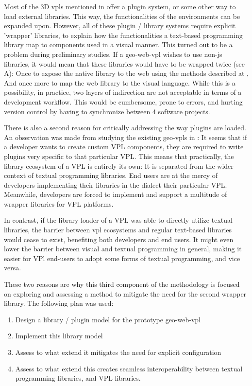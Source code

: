 
Most of the 3D vpls mentioned in  offer a plugin system, or some other way to load external libraries.
This way, the functionalities of the environments can be expanded upon.
However, all of these plugin / library systems require explicit 'wrapper' libraries, to explain how the functionalities a text-based programming library map to components used in a visual manner.
This turned out to be a problem during preliminary studies.
If a \ac{geo-web-vpl} wishes to use non-js libraries, it would mean that these libraries would have to be wrapped twice (see  A): 
Once to expose the native library to the web using the methods described at ,
And once more to map the web library to the visual language. 
While this is a possibility, in practice, two layers of indirection are not acceptable in terms of a development workflow.
This would be cumbersome, prone to errors, and hurting version control by having to synchronize between 4 software projects. 

There is also a second reason for critically addressing the way plugins are loaded. 
An observation was made from studying the existing geo-vpls in :
It seems that if a developer wants to create custom VPL components, they are required to write plugins very specific to that particular VPL.
This means that practically, the library ecosystem of a VPL is entirely its own: 
It is separated from the wider context of textual programming libraries. 
End users are at the mercy of developers implementing their libraries in the dialect their particular VPL.
Meanwhile, developers are forced to implement and support a multitude of wrapper libraries for VPL platforms.  

In contrast, if the library loader of a VPL was able to directly utilize textual libraries, the barrier between vpl ecosystems and regular text-based libraries would cease to exist, benefiting both developers and end users. 
It might even lower the barrier between visual and textual programming in general, making it easier for VPl end-users to adopt some forms of textual programming, and vice versa. 

These two reasons are why this third component of the methodology is focused on exploring and assessing a method to  mitigate the need for the second wrapper library. 
The following plan was used: 
\begin{enumerate}[-]
  \item Design a library / plugin model for the prototype \ac*{geo-web-vpl}
  \item Implement this library model 
  \item Assess to what extend it mitigates the need for explicit configuration
  \item Assess to what extend this creates seamless interoperability between textual programming libraries, and VPL libraries.
\end{enumerate}


